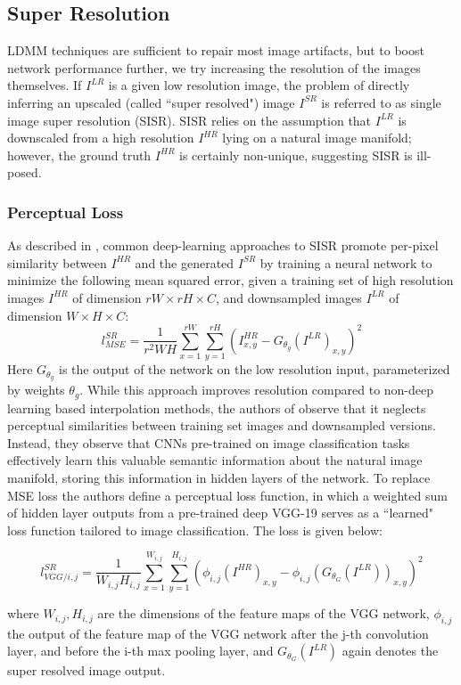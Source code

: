 \documentclass[a4paper]{article}
\begin{document}
\subsection{Super Resolution}
\justify
LDMM techniques are sufficient to repair most image artifacts, but to boost network performance further, we try increasing the resolution of the images themselves. If $I^{LR}$ is a given low resolution image, the problem of directly inferring an upscaled (called ``super resolved") image $I^{SR}$ is referred to as single image super resolution (SISR). SISR relies on the assumption that $I^{LR}$ is downscaled from a high resolution $I^{HR}$ lying on a natural image manifold; however, the ground truth $I^{HR}$ is certainly non-unique, suggesting SISR is ill-posed. 
\subsubsection{Perceptual Loss}

As described in \cite{Perceptual}, common deep-learning approaches to SISR promote per-pixel similarity between $I^{HR}$ and the generated $I^{SR}$ by training a neural network to minimize the following mean squared error, given a training set of high resolution images $I^{HR}$ of dimension $rW \times rH \times C$, and downsampled images $I^{LR}$ of dimension $W \times H \times C$:
$$l^{SR}_{MSE} = \frac{1}{r^2WH}\sum_{x=1}^{rW}\sum_{y=1}^{rH}(I^{HR}_{x,y}-G_{\theta_g}(I^{LR})_{x,y})^2$$
Here $G_{\theta_g}$ is the output of the network on the low resolution input, parameterized by weights $\theta_g$.
While this approach improves resolution compared to non-deep learning based interpolation methods, the authors of \cite{Perceptual} observe that it neglects perceptual similarities between training set images and downsampled versions. Instead, they observe that CNNs pre-trained on image classification tasks effectively learn this valuable semantic information about the natural image manifold, storing this information in hidden layers of the network. To replace MSE loss the authors define a perceptual loss function, in which a weighted sum of hidden layer outputs from a pre-trained deep VGG-19 serves as a ``learned" loss function tailored to image classification. The loss is given below: 

$$l^{SR}_{VGG/i,j} = \frac{1}{W_{i,j}H_{i,j}}\sum_{x=1}^{W_{i,j}}\sum_{y=1}^{H_{i,j}}(\phi_{i,j}(I^{HR})_{x,y} - \phi_{i,j}(G_{\theta_G}(I^{LR}))_{x,y})^2
$$

where $W_{i,j},H_{i,j}$ are the dimensions of the feature maps of the VGG network, $\phi_{i,j}$ the  output of the feature map of the VGG network after the j-th convolution layer, and before the i-th max pooling layer, and $G_{\theta_G}(I^{LR})$ again denotes the super resolved image output.
\end{document}
